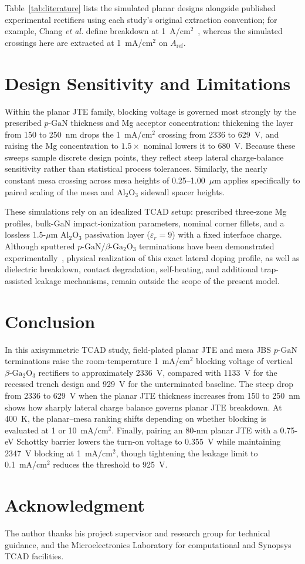 \documentclass[journal,10pt]{IEEEtran}
\newcommand{\GaO}{\ensuremath{\beta\text{-}\mathrm{Ga}_2\mathrm{O}_3}}
\newcommand{\pGaN}{\ensuremath{p\text{-}\mathrm{GaN}}}
\begin{document}
Table~\ref{tab:literature} lists the simulated planar designs alongside published experimental rectifiers using each study's original extraction convention; for example, Chang \emph{et al.} define breakdown at 1~A/cm$^2$~\cite{Chang2025_APL}, whereas the simulated crossings here are extracted at 1~mA/cm$^2$ on $A_{\mathrm{ref}}$.

\FloatBarrier
\section{Design Sensitivity and Limitations}
Within the planar JTE family, blocking voltage is governed most strongly by the prescribed \pGaN{} thickness and Mg acceptor concentration: thickening the layer from 150 to 250~nm drops the 1~mA/cm$^2$ crossing from 2336 to 629~V, and raising the Mg concentration to $1.5\times$ nominal lowers it to 680~V. Because these sweeps sample discrete design points, they reflect steep lateral charge-balance sensitivity rather than statistical process tolerances. Similarly, the nearly constant mesa crossing across mesa heights of 0.25--1.00~$\mu$m applies specifically to paired scaling of the mesa and Al$_2$O$_3$ sidewall spacer heights.

These simulations rely on an idealized TCAD setup: prescribed three-zone Mg profiles, bulk-GaN impact-ionization parameters, nominal corner fillets, and a lossless 1.5-$\mu$m Al$_2$O$_3$ passivation layer ($\varepsilon_r=9$) with a fixed interface charge. Although sputtered \pGaN/\GaO{} terminations have been demonstrated experimentally~\cite{Chang2025_APL}, physical realization of this exact lateral doping profile, as well as dielectric breakdown, contact degradation, self-heating, and additional trap-assisted leakage mechanisms, remain outside the scope of the present model.

\section{Conclusion}
In this axisymmetric TCAD study, field-plated planar JTE and mesa JBS \pGaN{} terminations raise the room-temperature 1~mA/cm$^2$ blocking voltage of vertical \GaO{} rectifiers to approximately 2336~V, compared with 1133~V for the recessed trench design and 929~V for the unterminated baseline. The steep drop from 2336 to 629~V when the planar JTE thickness increases from 150 to 250~nm shows how sharply lateral charge balance governs planar JTE breakdown. At 400~K, the planar--mesa ranking shifts depending on whether blocking is evaluated at 1 or 10~mA/cm$^2$. Finally, pairing an 80-nm planar JTE with a 0.75-eV Schottky barrier lowers the turn-on voltage to 0.355~V while maintaining 2347~V blocking at 1~mA/cm$^2$, though tightening the leakage limit to 0.1~mA/cm$^2$ reduces the threshold to 925~V.

\section*{Acknowledgment}
The author thanks his project supervisor and research group for technical guidance, and the Microelectronics Laboratory for computational and Synopsys TCAD facilities.



\end{document}
